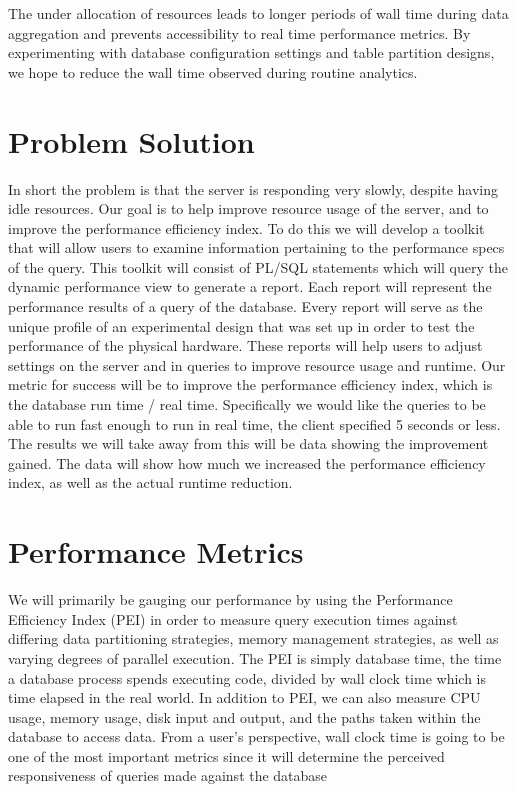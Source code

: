 \documentclass[draftclsnofoot, onecolumn, 10pt]{IEEEtran}
\begin{document}
The under allocation of resources leads to longer periods of wall time during data aggregation and prevents accessibility to real time performance metrics. By experimenting with database configuration settings and table partition designs, we hope to reduce the wall time observed during routine analytics.



\section*{Problem Solution}
In short the problem is that the server is responding very slowly, despite having idle resources. Our goal is to help improve resource usage of the server, and to improve the performance efficiency index. To do this we will develop a toolkit that will allow users to examine information pertaining to the performance specs of the query. This toolkit will consist of PL/SQL statements which will query the dynamic performance view to generate a report. Each report will represent the performance results of a query of the database. Every report will serve as the unique profile of an experimental design that was set up in order to test the performance of the physical hardware. These reports will help users to adjust settings on the server and in queries to improve resource usage and runtime. Our metric for success will be to improve the performance efficiency index, which is the database run time / real time. Specifically we would like the queries to be able to run fast enough to run in real time, the client specified 5 seconds or less. The results we will take away from this will be data showing the improvement gained. The data will show how much we increased the performance efficiency index, as well as the actual runtime reduction.  

\section*{Performance Metrics}
We will primarily be gauging our performance by using the Performance Efficiency Index (PEI) in order to measure query execution times against differing data partitioning strategies, memory management strategies, as well as varying degrees of parallel execution. The PEI is simply database time, the time a database process spends executing code, divided by wall clock time which is time elapsed in the real world. In addition to PEI, we can also measure CPU usage, memory usage, disk input and output, and the paths taken within the database to access data. From a user’s perspective, wall clock time is going to be one of the most important metrics since it will determine the perceived responsiveness of queries made against the database
\end{document}
